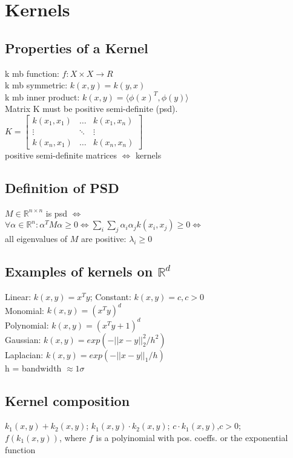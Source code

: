 \section*{\normalsize{Kernels }}

\subsection*{Properties of a Kernel}
k mb function: $f: X \times X \rightarrow R$\\
k mb symmetric: $k(x,y) = k(y,x)$\\
k mb inner product: $k(x,y) = \langle \phi(x)^T,\phi(y) \rangle$\\
Matrix K must be positive semi-definite (psd).\\
$K = 
\begin{bmatrix}
	k(x_1,x_1) & \dots & k(x_1,x_n) \\
	\vdots & \ddots & \vdots \\
	k(x_n, x_1) & \dots & k(x_n,x_n)
\end{bmatrix}$\\
positive semi-definite matrices $\Leftrightarrow$ kernels

\subsection*{Definition of PSD}
$M \in \mathbb{R}^{n\times n}$ is psd $\Leftrightarrow$\\
$\forall \alpha \in \mathbb{R}^n: \alpha^TM\alpha \geq 0 \Leftrightarrow \sum_i\sum_j \alpha_i \alpha_j k(x_i,x_j)\geq 0 \Leftrightarrow$\\
all eigenvalues of $M$ are positive: $\lambda_i\geq 0$



\subsection*{Examples of kernels on $\mathbb{R}^d$}
Linear: $k(x,y)=x^T y$; Constant: $ k(x,y)=c, c>0$\\
Monomial: $k(x,y)=(x^T y)^d$\\
Polynomial: $k(x,y)=(x^T y + 1)^d$\\
Gaussian: $k(x,y) = exp(-||x-y||_2^2/h^2)$\\
Laplacian: $k(x,y) = exp(-||x-y||_1/h)$\\
h = bandwidth $\approx 1\sigma$ 


\subsection*{Kernel composition}
$k_1(x,y) + k_2(x,y)$; $k_1(x,y) \cdot k_2(x,y)$; $c \cdot k_1(x,y)$,$c>0$;\\
$f(k_1(x,y))$, where $f$ is a polyinomial with pos. coeffs. or the exponential function


